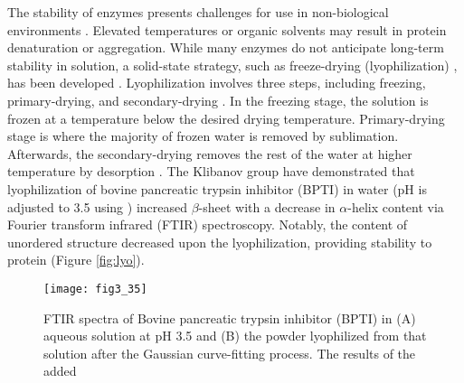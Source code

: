 \begin{refsection}
The stability of enzymes presents challenges for use in non-biological
environments \cite{Carpenter1993,Taylor2010}. Elevated temperatures
\cite{Rupley1991} or organic solvents \cite{Stepankova2013} may result in
protein denaturation or aggregation. While many enzymes do not anticipate
long-term stability in solution, a solid-state strategy, such as freeze-drying
(lyophilization) \cite{Carpenter1993,Luthra2007}, has been
developed \cite{Taylor2010}. Lyophilization involves three steps, including
freezing, primary-drying, and secondary-drying \cite{Luthra2007}. In the
freezing stage, the solution is frozen at a temperature below the desired
drying temperature. Primary-drying stage is where the majority of frozen water
is removed by sublimation. Afterwards, the secondary-drying removes the rest of
the water at higher temperature by desorption \cite{Luthra2007,Griebenow1995}.
The Klibanov group have demonstrated that lyophilization of bovine pancreatic
trypsin inhibitor (BPTI) in water (pH is adjusted to 3.5 using )
increased $\beta$-sheet with a decrease in $\alpha$-helix content via Fourier
transform infrared (FTIR) spectroscopy. Notably, the content of unordered
structure decreased upon the lyophilization, providing stability to protein
\cite{Griebenow1995} (Figure \ref{fig:lyo}). 
\begin{figure}[htbp] \centering \texttt{[image: fig3\_35]}
    \caption[FTIR spectra of Bovine pancreatic trypsin inhibitor (BPTI) in (A)
    aqueous solution at pH 3.5 and (B) the powder lyophilized from that
solution after the Gaussian curve-fitting process. The results of the added
Gaussian bands and the original spectra (solid lines) are superimposed and are
nearly identical. The area of the individual Gaussian bands (broken lines) has
been used to calculate the secondary structure content. The individual bands
were assigned as follows: (A) a, b, and c, $\alpha$-helix; d and e, unordered;
f and g, $beta$-sheet; (B) a, $alpha$-helix; b and c, unordered; d and e,
$beta$-sheet. The bands at \SI{1205}{\per\cm}  are not an amide III vibration
and are presented solely for the fit. The band at around \SI{1340}{\per\cm} in
the spectrum of the powder (B), which is of an unknown origin and not found in
the BPTI spectrum in aqueous solution, was not assigned to any secondary
structural element.]{FTIR spectra of Bovine pancreatic trypsin inhibitor (BPTI)
    in (A) aqueous solution at pH 3.5 and (B) the powder lyophilized from that
    solution after the Gaussian curve-fitting process. The results of the added
}
\end{figure}
\end{refsection}
